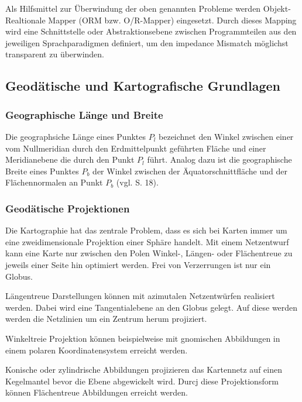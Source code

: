 Als Hilfsmittel zur Überwindung der oben genannten Probleme werden Objekt-Realtionale Mapper (ORM bzw. O/R-Mapper) eingesetzt. Durch dieses Mapping wird eine Schnittstelle oder Abstraktionsebene zwischen Programmteilen aus den jeweiligen Sprachparadigmen definiert, um den impedance Mismatch möglichst transparent zu überwinden.




    

\subsection{Geodätische und Kartografische Grundlagen}

\subsubsection{Geographische Länge und Breite}

Die geographsiche Länge eines Punktes $P_l$ bezeichnet den Winkel zwischen einer vom Nullmeridian durch den Erdmittelpunkt geführten Fläche und einer Meridianebene die durch den Punkt $P_l$ führt.
Analog dazu ist die geographische Breite eines Punktes $P_b$ der Winkel zwischen der Äquatorschnittfläche und der Flächennormalen an Punkt $P_b$ (vgl.  \cite{witte2011vermessungskunde} S. 18). 

\subsubsection{Geodätische Projektionen}

Die Kartographie hat das zentrale Problem, dass es sich bei Karten immer um eine zweidimensionale Projektion einer Sphäre handelt. Mit einem Netzentwurf kann eine Karte nur zwischen den Polen Winkel-, Längen- oder Flächentreue zu jeweils einer Seite hin optimiert werden. Frei von Verzerrungen ist nur ein Globus.

Längentreue Darstellungen können mit azimutalen Netzentwürfen realisiert werden. Dabei wird eine Tangentialebene an den Globus gelegt. Auf diese werden werden die Netzlinien um ein Zentrum herum projiziert.

Winkeltreie Projektion können beispielweise mit gnomischen Abbildungen in einem polaren Koordinatensystem erreicht werden. 

Konische  oder zylindrische Abbildungen projizieren das Kartennetz auf einen Kegelmantel bevor die Ebene abgewickelt wird. Durcj diese Projektionsform können Flächentreue Abbildungen erreicht werden.


